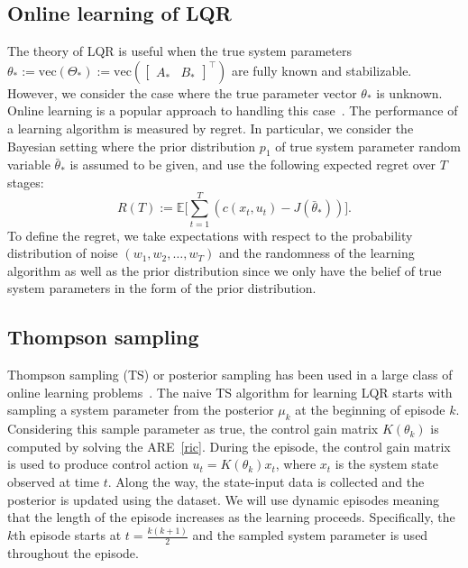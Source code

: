 \documentclass[11pt]{article}
\theoremstyle{plain}
\theoremstyle{definition}
\theoremstyle{remark}
\begin{document}
\subsection{Online learning of LQR}

The theory of LQR is useful when the true system parameters ${\theta_*} := \mathrm{vec}( \Theta_*):= \mathrm{vec}(\begin{bmatrix} 
A_* & B_*
\end{bmatrix}^\top)$
are fully known and stabilizable.
However, we consider the case where the true parameter vector $\theta_*$ is unknown. 
Online learning is a popular approach to handling this case~\cite{abbasi2011regret}. 
The performance of a learning algorithm is measured by regret. In particular, we consider the Bayesian setting where the prior distribution $p_1$ of true system parameter random variable $\bar{\theta}_*$ is assumed to be given, and use the following expected regret 
over $T$ stages:
\begin{equation}\label{regret}
R(T) := \mathbb{E} \bigg [
\sum_{t=1}^T ( c (x_t, u_t) - J (\bar{\theta}_*))
\bigg ].
\end{equation}
To define the regret, we take expectations with respect to the probability distribution of noise $(w_1, w_2, \ldots, w_T)$ and the randomness of the learning algorithm as well as the prior distribution since we only have the belief of true system parameters in the form of the prior distribution.
\subsection{Thompson sampling}

Thompson sampling (TS) or posterior sampling has been used in a large class of online learning problems~\cite{russo2017tutorial}. The naive TS algorithm for learning LQR  starts with sampling a system parameter from the posterior $\mu_k$ at the beginning of episode $k$. Considering this sample parameter as true, the control gain matrix $K(\theta_{k})$ is computed by solving the ARE~\eqref{ric}. During the episode, the control gain matrix is used to produce control action $u_t=K(\theta_k)x_t$, where $x_t$ is the system state observed at time $t$.  Along the way, the state-input data is collected and the posterior is updated using the dataset. 
We will use dynamic episodes meaning that the length of the episode increases as the learning proceeds. Specifically, the $k$th episode starts at $t=\frac{k(k+1)}{2}$ and the sampled system parameter is used   throughout the episode.
\end{document}
